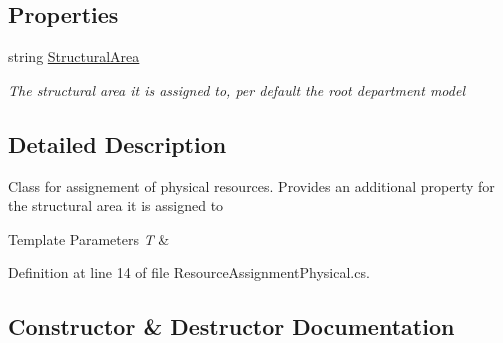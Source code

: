 \subsection*{Properties}
\begin{DoxyCompactItemize}
\item 
string \hyperlink{class_general_health_care_elements_1_1_resource_handling_1_1_resource_assignment_physical_a5b1d197591089a546ef04d477933dec5}{Structural\+Area}
\begin{DoxyCompactList}\small\item\em The structural area it is assigned to, per default the root department model \end{DoxyCompactList}\end{DoxyCompactItemize}


\subsection{Detailed Description}
Class for assignement of physical resources. Provides an additional property for the structural area it is assigned to 


\begin{DoxyTemplParams}{Template Parameters}
{\em T} & \\
\hline
\end{DoxyTemplParams}


Definition at line 14 of file Resource\+Assignment\+Physical.\+cs.



\subsection{Constructor \& Destructor Documentation}
